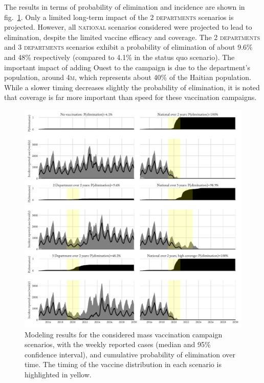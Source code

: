 The results in terms of probability of elimination and incidence are shown in fig.~\ref{fig:OCVresults}. Only a limited long-term impact of the \textsc{2 departments} scenarios is projected. However, all \textsc{national} scenarios considered were projected to lead to elimination, despite the limited vaccine efficacy and coverage. The \textsc{2 departments} and \textsc{3 departments} scenarios exhibit a probability of elimination of about 9.6\% and 48\% respectively (compared to 4.1\% in the status quo scenario). The important impact of adding Ouest to the campaign is due to the department's population, around 4\textsc{m}, which represents about 40\% of the Haitian population. While a slower timing decreases slightly the probability of elimination, it is noted that coverage is far more important than speed for these vaccination campaigns.

\begin{figure}[h!]%
\begin{center}
\includegraphics{fig_cholera-haiti-ocv/haiti-scn.pdf}
\caption[Model results: probability of cholera elimination after mass vaccination campaigns]{Modeling results for the considered mass vaccination campaign scenarios, with the weekly reported cases (median and 95\% confidence interval), and cumulative probability of elimination over time. The timing of the vaccine distribution in each scenario is highlighted in yellow.}
\label{fig:OCVresults}
\end{center}
\end{figure}
 

